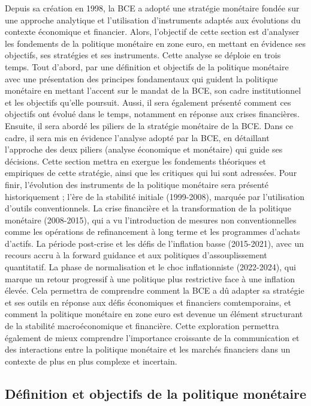 Depuis sa création en 1998, la BCE a adopté une stratégie monétaire fondée sur une approche analytique et l’utilisation d’instruments adaptés aux évolutions du contexte économique et financier. Alors, l’objectif de cette section est d’analyser les fondements de la politique monétaire en zone euro, en mettant en évidence ses objectifs, ses stratégies et ses instruments. Cette analyse se déploie en trois temps. Tout d'abord, par une définition et objectifs de la politique monétaire avec une présentation des principes fondamentaux qui guident la politique monétaire en mettant l’accent sur le mandat de la BCE, son cadre institutionnel et les objectifs qu’elle poursuit. Aussi, il sera également présenté comment ces objectifs ont évolué dans le temps, notamment en réponse aux crises financières. Ensuite, il sera abordé les piliers de la stratégie monétaire de la BCE. Dans ce cadre, il sera mis en évidence l'analyse adopté par la BCE, en détaillant l’approche des deux piliers (analyse économique et monétaire) qui guide ses décisions. Cette section mettra en exergue les fondements théoriques et empiriques de cette stratégie, ainsi que les critiques qui lui sont adressées. Pour finir, l'évolution des instruments de la politique monétaire sera présenté historiquement ; l’ère de la stabilité initiale (1999-2008), marquée par l’utilisation d’outils conventionnels. La crise financière et la transformation de la politique monétaire (2008-2015), qui a vu l’introduction de mesures non conventionnelles comme les opérations de refinancement à long terme et les programmes d’achats d’actifs. La période post-crise et les défis de l’inflation basse (2015-2021), avec un recours accru à la forward guidance et aux politiques d’assouplissement quantitatif. La phase de normalisation et le choc inflationniste (2022-2024), qui marque un retour progressif à une politique plus restrictive face à une inflation élevée. Cela permettra de comprendre comment la BCE a dû adapter sa stratégie et ses outils en réponse aux défis économiques et financiers comtemporains, et comment la politique monétaire en zone euro est devenue un élément structurant de la stabilité macroéconomique et financière. Cette exploration permettra également de mieux comprendre l’importance croissante de la communication et des interactions entre la politique monétaire et les marchés financiers dans un contexte de plus en plus complexe et incertain.

\subsection{Définition et objectifs de la politique monétaire}

